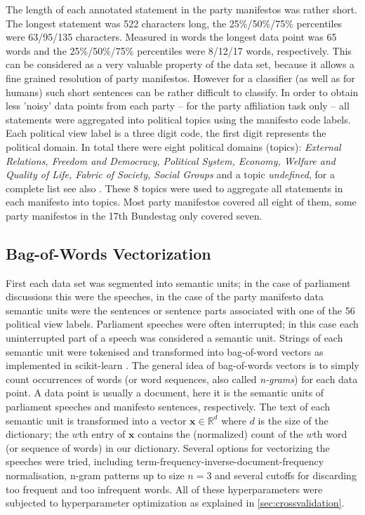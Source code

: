 \documentclass{article}
\renewcommand{\vec}[1]{\mathbf{#1}}
\begin{document}
The length of each annotated statement in the party manifestos was rather short. The longest statement was 522 characters long, the 25\%/50\%/75\% percentiles were 63/95/135 characters. Measured in words the longest data point was 65 words and the 25\%/50\%/75\% percentiles were 8/12/17 words, respectively. This can be considered as a very valuable property of the data set, because it allows a fine grained resolution of party manifestos. However for a classifier (as well as for humans) such short sentences can be rather difficult to classify. In order to obtain less 'noisy' data points from each party -- for the party affiliation task only -- all statements were aggregated into political topics using the manifesto code labels. Each political view label is a three digit code, the first digit represents the political domain. In total there were eight political domains (topics): {\em External Relations, Freedom and Democracy, Political System, Economy, Welfare and Quality of Life, Fabric of Society, Social Groups} and a topic {\em undefined}, for a complete list see also \cite{leftright}. These 8 topics were used to aggregate all statements in each manifesto into topics. Most party manifestos covered all eight of them, some party manifestos in the 17th Bundestag only covered seven. 

\subsection{Bag-of-Words Vectorization}\label{sec:bow-vectorization}
First each data set was segmented into semantic units; in the case of parliament discussions this were the speeches, in the case of the party manifesto data semantic units were the sentences or sentence parts associated with one of the 56 political view labels.  Parliament speeches were often interrupted; in this case each uninterrupted part of a speech was considered a semantic unit. Strings of each semantic unit were tokenised and transformed into bag-of-word vectors as implemented in scikit-learn \cite{scikit-learn}. The general idea of bag-of-words vectors is to simply count occurrences of words (or word sequences, also called {\em n-grams}) for each data point. A data point is usually a document, here it is the semantic units of parliament speeches and manifesto sentences, respectively. The text of each semantic unit is transformed into a vector $\vec{x}\in\mathds{R}^d$ where $d$ is the size of the dictionary; the $w$th entry of $\vec{x}$ contains the (normalized) count of the $w$th word (or sequence of words) in our dictionary. Several options for vectorizing the speeches were tried, including term-frequency-inverse-document-frequency normalisation, n-gram patterns up to size $n=3$ and several cutoffs for discarding too frequent and too infrequent words. All of these hyperparameters were subjected to hyperparameter optimization as explained in \autoref{sec:crossvalidation}. 
\end{document}
